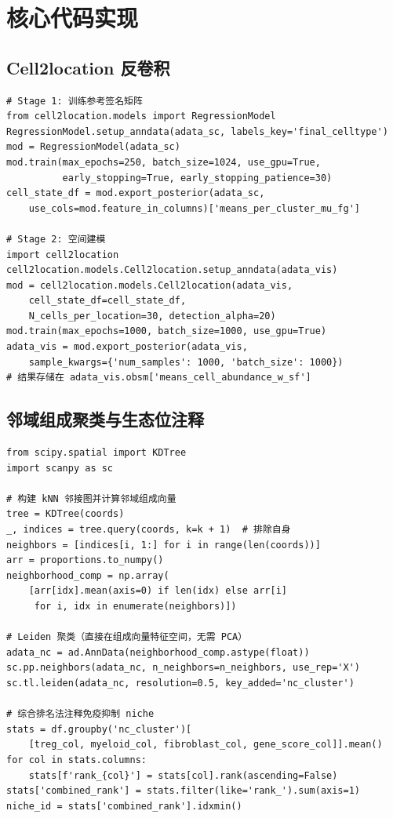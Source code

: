 \documentclass[12pt, a4paper]{ctexart}
\begin{document}
\section{核心代码实现}
\label{app:code}

\subsection{Cell2location 反卷积}

\begin{lstlisting}[caption={RegressionModel 训练与空间建模核心代码}]
# Stage 1: 训练参考签名矩阵
from cell2location.models import RegressionModel
RegressionModel.setup_anndata(adata_sc, labels_key='final_celltype')
mod = RegressionModel(adata_sc)
mod.train(max_epochs=250, batch_size=1024, use_gpu=True,
          early_stopping=True, early_stopping_patience=30)
cell_state_df = mod.export_posterior(adata_sc,
    use_cols=mod.feature_in_columns)['means_per_cluster_mu_fg']

# Stage 2: 空间建模
import cell2location
cell2location.models.Cell2location.setup_anndata(adata_vis)
mod = cell2location.models.Cell2location(adata_vis,
    cell_state_df=cell_state_df,
    N_cells_per_location=30, detection_alpha=20)
mod.train(max_epochs=1000, batch_size=1000, use_gpu=True)
adata_vis = mod.export_posterior(adata_vis,
    sample_kwargs={'num_samples': 1000, 'batch_size': 1000})
# 结果存储在 adata_vis.obsm['means_cell_abundance_w_sf']
\end{lstlisting}

\subsection{邻域组成聚类与生态位注释}

\begin{lstlisting}[caption={邻域组成向量计算、Leiden 聚类与综合排名注释}]
from scipy.spatial import KDTree
import scanpy as sc

# 构建 kNN 邻接图并计算邻域组成向量
tree = KDTree(coords)
_, indices = tree.query(coords, k=k + 1)  # 排除自身
neighbors = [indices[i, 1:] for i in range(len(coords))]
arr = proportions.to_numpy()
neighborhood_comp = np.array(
    [arr[idx].mean(axis=0) if len(idx) else arr[i]
     for i, idx in enumerate(neighbors)])

# Leiden 聚类（直接在组成向量特征空间，无需 PCA）
adata_nc = ad.AnnData(neighborhood_comp.astype(float))
sc.pp.neighbors(adata_nc, n_neighbors=n_neighbors, use_rep='X')
sc.tl.leiden(adata_nc, resolution=0.5, key_added='nc_cluster')

# 综合排名法注释免疫抑制 niche
stats = df.groupby('nc_cluster')[
    [treg_col, myeloid_col, fibroblast_col, gene_score_col]].mean()
for col in stats.columns:
    stats[f'rank_{col}'] = stats[col].rank(ascending=False)
stats['combined_rank'] = stats.filter(like='rank_').sum(axis=1)
niche_id = stats['combined_rank'].idxmin()
\end{lstlisting}
\end{document}
